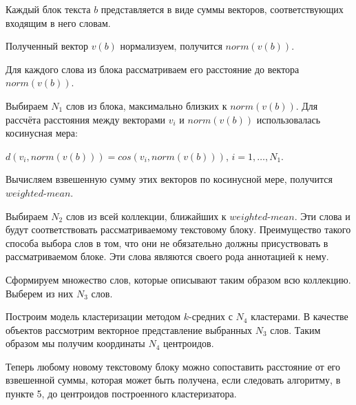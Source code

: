 \documentclass[14pt]{matmex-diploma-custom}
\begin{document}
\par\begin{enumerate}{
		\vspace{-0.2cm}\item Каждый блок текста	$b$ представляется в виде суммы векторов, соответствующих входящим в него словам.
		\vspace{-0.2cm}\item Полученный вектор $v(b)$ нормализуем, получится $norm(v(b))$.
		\vspace{-0.2cm}\item Для каждого слова из блока рассматриваем его расстояние до вектора $norm(v(b))$.
		\vspace{-0.2cm}\item Выбираем $N_1$ слов из блока, максимально близких к $norm(v(b))$. Для рассчёта расстояния между векторами $v_i$ и $norm(v(b))$ использовалась косинусная мера: 
		
		$d(v_i,norm(v(b))) = cos(v_i,norm(v(b)))$,\hspace{0.5cm} $i = 1, \ldots, N_1.$
		
		\vspace{-0.2cm}\item Вычисляем взвешенную сумму этих векторов по косинусной мере, получится $weighted$-$mean$.
		\vspace{-0.2cm}\item Выбираем $N_2$ слов из всей коллекции, ближайших к $weighted$-$mean$. Эти слова и будут соответствовать рассматриваемому текстовому блоку.  Преимущество такого способа выбора слов в том, что они не обязательно должны присуствовать в рассматриваемом блоке. Эти слова являются своего рода аннотацией к нему.
		\vspace{-0.2cm}\item Сформируем множество слов, которые описывают таким образом всю коллекцию. Выберем из них $N_3$ слов.
		\vspace{-0.2cm}\item Построим модель кластеризации методом $k$-средних с $N_4$ кластерами. В качестве объектов рассмотрим векторное представление выбранных $N_3$ слов. Таким образом мы получим координаты $N_4$ центроидов.
		\vspace{-0.2cm}\item Теперь любому новому текстовому блоку можно сопоставить расстояние от его взвешенной суммы, которая может быть получена, если следовать алгоритму, в пункте 5, до центроидов построенного кластеризатора. 
}\end{enumerate}
\end{document}
